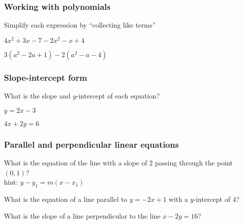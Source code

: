 \subsubsection*{Working with polynomials}
\item Simplify each expression by ``collecting like terms''
\begin{enumerate}[itemsep=2cm]
    \begin{multicols}{2}
      \item $4x^2+3x -7 -2x^2-x+4$
      \item $3(a^2-2a +1) -2(a^2-a-4)$
    \end{multicols}
    \end{enumerate} \vspace{2cm}
  
  \subsubsection*{Slope-intercept form}
  \item What is the slope and $y$-intercept of each equation?
\begin{enumerate}[itemsep=2cm]
    \begin{multicols}{2}
      \item   $y=2x-3$
      \item   $4x+2y=6$
    \end{multicols}
    \end{enumerate} \vspace{1.5cm}

\newpage
\subsubsection*{Parallel and perpendicular linear equations}

  \item What is the equation of the line with a slope of 2 passing through the point $(0,1)$? \\
  hint: $y-y_1=m(x-x_1)$ \vspace{1.5cm}
  \item What is the equation of a line parallel to $y=-2x+1$ with a $y$-intercept of 4? \vspace{1.5cm}
  \item What is the slope of a line perpendicular to the line $x-2y=16$? \vspace{3cm}

